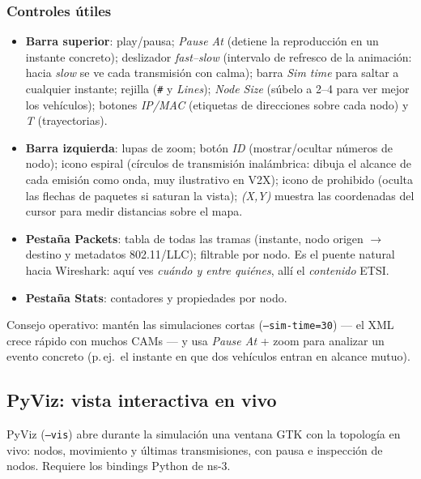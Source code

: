 \documentclass[11pt,a4paper]{article}
\begin{document}
\subsubsection*{Controles \'utiles}

\begin{itemize}
  \item \textbf{Barra superior}: play/pausa; \emph{Pause At} (detiene la
  reproducci\'on en un instante concreto); deslizador \emph{fast--slow}
  (intervalo de refresco de la animaci\'on: hacia \emph{slow} se ve cada
  transmisi\'on con calma); barra \emph{Sim time} para saltar a cualquier
  instante; rejilla (\texttt{\#} y \emph{Lines}); \emph{Node Size}
  (s\'ubelo a 2--4 para ver mejor los veh\'iculos); botones \emph{IP/MAC}
  (etiquetas de direcciones sobre cada nodo) y \emph{T} (trayectorias).
  \item \textbf{Barra izquierda}: lupas de zoom; bot\'on \emph{ID}
  (mostrar/ocultar n\'umeros de nodo); icono espiral (c\'irculos de
  transmisi\'on inal\'ambrica: dibuja el alcance de cada emisi\'on como
  onda, muy ilustrativo en V2X); icono de prohibido (oculta las flechas de
  paquetes si saturan la vista); \emph{(X,Y)} muestra las coordenadas del
  cursor para medir distancias sobre el mapa.
  \item \textbf{Pesta\~na Packets}: tabla de todas las tramas (instante,
  nodo origen $\to$ destino y metadatos 802.11/LLC); filtrable por nodo.
  Es el puente natural hacia Wireshark: aqu\'i ves \emph{cu\'ando y entre
  qui\'enes}, all\'i el \emph{contenido} ETSI.
  \item \textbf{Pesta\~na Stats}: contadores y propiedades por nodo.
\end{itemize}

Consejo operativo: mant\'en las simulaciones cortas
(\texttt{--sim-time=30}) --- el XML crece r\'apido con muchos CAMs --- y usa
\emph{Pause At} + zoom para analizar un evento concreto (p.\,ej.\ el
instante en que dos veh\'iculos entran en alcance mutuo).

\subsection{PyViz: vista interactiva en vivo}
\label{sec:pyviz}

PyViz (\texttt{--vis}) abre durante la simulaci\'on una ventana GTK con la
topolog\'ia en vivo: nodos, movimiento y \'ultimas transmisiones, con pausa
e inspecci\'on de nodos. Requiere los bindings Python de ns-3.
\end{document}
